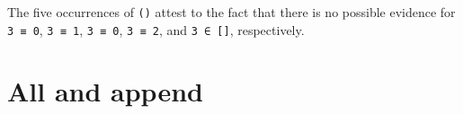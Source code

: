 \begin{fence}
\begin{code}%
\>[0]\AgdaSpace{}%
\AgdaSymbol{:}\AgdaSpace{}%
\AgdaSpace{}%
\AgdaSpace{}%
\AgdaOperator{\AgdaInductiveConstructor{[}}\AgdaSpace{}%
\AgdaSpace{}%
\AgdaOperator{\AgdaInductiveConstructor{,}}\AgdaSpace{}%
\AgdaSpace{}%
\AgdaOperator{\AgdaInductiveConstructor{,}}\AgdaSpace{}%
\AgdaSpace{}%
\AgdaOperator{\AgdaInductiveConstructor{,}}\AgdaSpace{}%
\AgdaSpace{}%
\AgdaOperator{\AgdaInductiveConstructor{]}}\<%
\\
\>[0]\AgdaSpace{}%
\AgdaSymbol{(}\AgdaSpace{}%
\AgdaSymbol{())}\<%
\\
\>[0]\AgdaSpace{}%
\AgdaSymbol{(}\AgdaSpace{}%
\AgdaSymbol{(}\AgdaSpace{}%
\AgdaSymbol{()))}\<%
\\
\>[0]\AgdaSpace{}%
\AgdaSymbol{(}\AgdaSpace{}%
\AgdaSymbol{(}\AgdaSpace{}%
\AgdaSymbol{(}\AgdaSpace{}%
\AgdaSymbol{())))}\<%
\\
\>[0]\AgdaSpace{}%
\AgdaSymbol{(}\AgdaSpace{}%
\AgdaSymbol{(}\AgdaSpace{}%
\AgdaSymbol{(}\AgdaSpace{}%
\AgdaSymbol{(}\AgdaSpace{}%
\AgdaSymbol{()))))}\<%
\\
\>[0]\AgdaSpace{}%
\AgdaSymbol{(}\AgdaSpace{}%
\AgdaSymbol{(}\AgdaSpace{}%
\AgdaSymbol{(}\AgdaSpace{}%
\AgdaSymbol{(}\AgdaSpace{}%
\AgdaSymbol{()))))}\<%
\end{code}
\end{fence}

The five occurrences of \texttt{()} attest to the fact that there is no
possible evidence for \texttt{3\ ≡\ 0}, \texttt{3\ ≡\ 1},
\texttt{3\ ≡\ 0}, \texttt{3\ ≡\ 2}, and \texttt{3\ ∈\ {[}{]}},
respectively.

\hypertarget{all-and-append}{%
\section{All and append}\label{all-and-append}}

